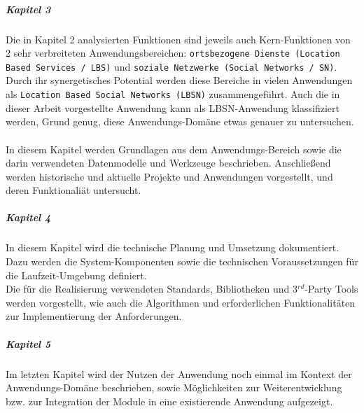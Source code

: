 \subparagraph{Kapitel 3}
Die in Kapitel 2 analysierten Funktionen sind jeweils auch Kern-Funktionen von 2 sehr verbreiteten Anwendungsbereichen: \texttt{ortsbezogene Dienste (Location Based Services / LBS)} und \texttt{soziale Netzwerke (Social Networks / SN)}. Durch ihr synergetisches Potential werden diese Bereiche in vielen Anwendungen als \texttt{Location Based Social Networks (LBSN)} zusammengeführt. Auch die in dieser Arbeit vorgestellte Anwendung kann als LBSN-Anwendung klassifiziert werden, Grund genug, diese Anwendungs-Domäne etwas genauer zu untersuchen.\\ \\
In diesem Kapitel werden Grundlagen aus
dem Anwendungs-Bereich sowie die darin verwendeten Datenmodelle und Werkzeuge beschrieben.
Anschließend werden historische und aktuelle Projekte und Anwendungen vorgestellt, und
deren Funktionaliät untersucht.


\subparagraph{Kapitel 4}
In diesem Kapitel wird die technische Planung und Umsetzung dokumentiert. Dazu werden die System-Komponenten  sowie die technischen Voraussetzungen für die Laufzeit-Umgebung definiert.\\
Die für die Realisierung verwendeten Standards, Bibliotheken und 3$^{rd}$-Party Tools werden vorgestellt, wie auch die Algorithmen und erforderlichen Funktionalitäten zur Implementierung der Anforderungen.

\subparagraph{Kapitel 5}
Im letzten Kapitel wird der Nutzen der Anwendung noch einmal im Kontext der Anwendungs-Domäne beschrieben, sowie Möglichkeiten zur Weiterentwicklung bzw. zur Integration der Module in eine existierende Anwendung aufgezeigt.



\newpage
%
%
